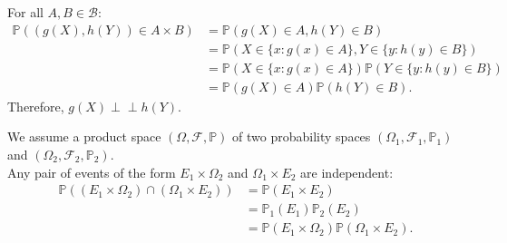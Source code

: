 \documentclass{huhtakm-template-book-v2}
\newcommand{\independent}{\perp\!\!\!\perp}
\newcommand{\prob}{\mathbb{P}}
\begin{document}
    \begin{proofing}
        For all $A,B \in \mathcal{B}$:
        \begin{align*}
            \prob((g(X),h(Y)) \in A\times B) &= \prob(g(X) \in A,h(Y) \in B)\\
            &= \prob(X \in \{x:g(x) \in A\},Y \in \{y:h(y) \in B\})\\
            &= \prob(X \in \{x:g(x) \in A\})\prob(Y \in \{y:h(y) \in B\})\\
            &= \prob(g(X) \in A)\prob(h(Y) \in B).
        \end{align*}
        Therefore, $g(X) \independent h(Y)$.
    \end{proofing}
    \begin{rem}
        We assume a product space $(\Omega,\mathcal{F},\prob)$ of two probability spaces $(\Omega_{1},\mathcal{F}_{1},\prob_{1})$ and $(\Omega_{2},\mathcal{F}_{2},\prob_{2})$.\\
        Any pair of events of the form $E_{1}\times\Omega_{2}$ and $\Omega_{1}\times E_{2}$ are independent:
        \begin{align*}
            \prob((E_{1}\times\Omega_{2})\cap(\Omega_{1}\times E_{2})) &= \prob(E_{1}\times E_{2})\\
            &= \prob_{1}(E_{1})\prob_{2}(E_{2})\\
            &= \prob(E_{1}\times\Omega_{2})\prob(\Omega_{1}\times E_{2}).
        \end{align*}
    \end{rem}
    \newpage
\end{document}
